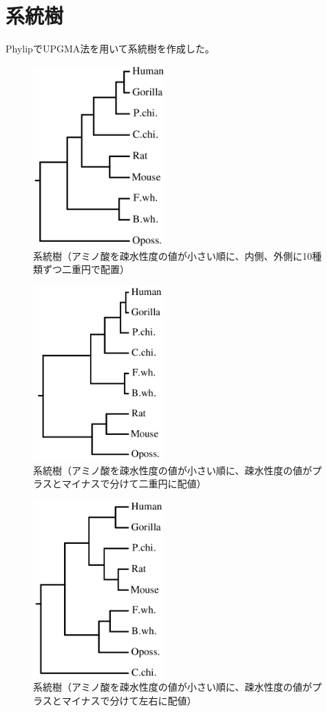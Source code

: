 \documentclass[a4paper,12pt]{jsreport}
\begin{document}
\newpage
\section{系統樹}
PhylipでUPGMA法を用いて系統樹を作成した。


\begin{figure}[H]
\centering
\includegraphics[width=50mm]{picx1.png}
\caption{系統樹（アミノ酸を疎水性度の値が小さい順に、内側、外側に10種類ずつ二重円で配置）}
\end{figure}

\begin{figure}[H]
\centering
\includegraphics[width=50mm]{picx2.png}
\caption{系統樹（アミノ酸を疎水性度の値が小さい順に、疎水性度の値がプラスとマイナスで分けて二重円に配値）}
\end{figure}

\begin{figure}[H]
\centering
\includegraphics[width=50mm]{picx3.png}
\caption{系統樹（アミノ酸を疎水性度の値が小さい順に、疎水性度の値がプラスとマイナスで分けて左右に配値）}
\end{figure}
\end{document}
